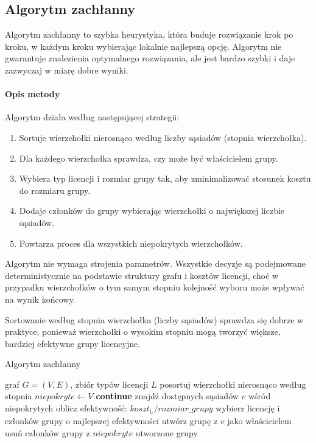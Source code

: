 \subsection{Algorytm zachłanny}\label{subsec:greedy}

Algorytm zachłanny to szybka heurystyka, która buduje rozwiązanie krok po kroku, w każdym kroku wybierając lokalnie najlepszą opcję. Algorytm nie gwarantuje znalezienia optymalnego rozwiązania, ale jest bardzo szybki i daje zazwyczaj w miarę dobre wyniki.

\paragraph{Opis metody}
Algorytm działa według następującej strategii:
\begin{enumerate}
  \item Sortuje wierzchołki nierosnąco według liczby sąsiadów (stopnia wierzchołka).
  \item Dla każdego wierzchołka sprawdza, czy może być właścicielem grupy.
  \item Wybiera typ licencji i rozmiar grupy tak, aby zminimalizować stosunek kosztu do rozmiaru grupy.
  \item Dodaje członków do grupy wybierając wierzchołki o największej liczbie sąsiadów.
  \item Powtarza proces dla wszystkich niepokrytych wierzchołków.
\end{enumerate}

Algorytm nie wymaga strojenia parametrów. Wszystkie decyzje są podejmowane deterministycznie na podstawie struktury grafu i kosztów licencji, choć w przypadku wierzchołków o tym samym stopniu kolejność wyboru może wpływać na wynik końcowy.

Sortowanie według stopnia wierzchołka (liczby sąsiadów) sprawdza się dobrze w praktyce, ponieważ wierzchołki o wysokim stopniu mogą tworzyć większe, bardziej efektywne grupy licencyjne.

\begin{algorithm}[H]
  \caption{Algorytm zachłanny}
  \label{alg:greedy}
  \begin{algorithmic}[1]
    \Require graf $G=(V,E)$, zbiór typów licencji $L$
    \State posortuj wierzchołki nierosnąco według stopnia
    \State $niepokryte \gets V$
     \textbf{continue} \EndIf
    \State znajdź dostępnych sąsiadów $v$ wśród niepokrytych
    \State oblicz efektywność: $koszt_{l_t} / rozmiar\_grupy$
    \EndFor
    \State wybierz licencję i członków grupy o najlepszej efektywności
    \State utwórz grupę z $v$ jako właścicielem
    \State usuń członków grupy z $niepokryte$
    \EndFor
    \State \Return utworzone grupy
  \end{algorithmic}
\end{algorithm}


